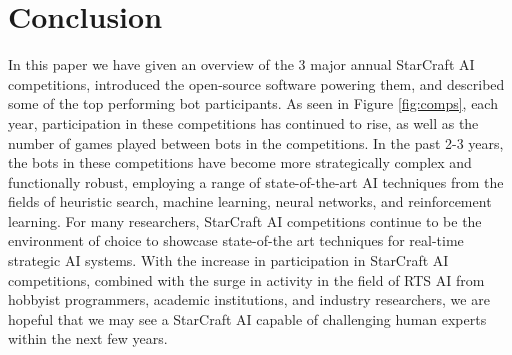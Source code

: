 \section{Conclusion}\label{secConclusion}

In this paper we have given an overview of the 3 major annual StarCraft AI competitions, introduced the open-source software powering them, and described some of the top performing bot participants. As seen in Figure \ref{fig:comps}, each year, participation in these competitions has continued to rise, as well as the number of games played between bots in the competitions. In the past 2-3 years, the bots in these competitions have become more strategically complex and functionally robust, employing a range of state-of-the-art AI techniques from the fields of heuristic search, machine learning, neural networks, and reinforcement learning. For many researchers, StarCraft AI competitions continue to be the environment of choice to showcase state-of-the art techniques for real-time strategic AI systems. With the increase in participation in StarCraft AI competitions, combined with the surge in activity in the field of RTS AI from hobbyist programmers, academic institutions, and industry researchers, we are hopeful that we may see a StarCraft AI capable of challenging human experts within the next few years.


